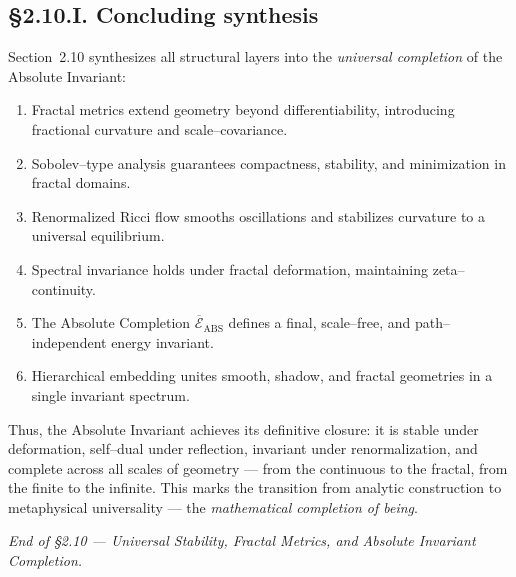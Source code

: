 \subsection*{§2.10.I. Concluding synthesis}

Section~2.10 synthesizes all structural layers into the \emph{universal completion} of the Absolute Invariant:
\begin{enumerate}
  \item Fractal metrics extend geometry beyond differentiability, introducing fractional curvature and scale–covariance.
  \item Sobolev–type analysis guarantees compactness, stability, and minimization in fractal domains.
  \item Renormalized Ricci flow smooths oscillations and stabilizes curvature to a universal equilibrium.
  \item Spectral invariance holds under fractal deformation, maintaining zeta–continuity.
  \item The Absolute Completion $\overline{\mathcal{E}}_{\mathrm{ABS}}$ defines a final, scale–free, and path–independent energy invariant.
  \item Hierarchical embedding unites smooth, shadow, and fractal geometries in a single invariant spectrum.
\end{enumerate}

Thus, the Absolute Invariant achieves its definitive closure:
it is stable under deformation, self–dual under reflection, invariant under renormalization, and complete across all
scales of geometry — from the continuous to the fractal, from the finite to the infinite.
This marks the transition from analytic construction to metaphysical universality — the \emph{mathematical completion of being}.

\begin{center}
\textit{End of §2.10 — Universal Stability, Fractal Metrics, and Absolute Invariant Completion.}
\end{center}


